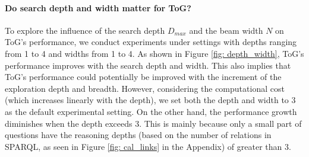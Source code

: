 \documentclass{article} %
\begin{document}
\paragraph{Do search depth and width matter for ToG?}
\label{sec: depth_breadth}
\begin{table}
\centering
\vspace{-0.4cm}
\caption{Performances of ToG using different source KGs on CWQ and WebQSP.}
\label{table: KG}
\end{table}
To explore the influence of the search depth $D_{max}$ and the beam width $N$ on ToG's performance, we conduct experiments under settings with depths ranging from 1 to 4 and widths from 1 to 4. As shown in Figure \ref{fig: depth_width}, ToG's performance improves with the search depth and width. This also implies that ToG's performance could potentially be improved with the increment of the exploration depth and breadth.
However, considering the computational cost (which increases linearly with the depth), we set both the depth and width to 3 as the default experimental setting. On the other hand, the performance growth diminishes when the depth exceeds 3. This is mainly because only a small part of questions have the reasoning depths (based on the number of relations in SPARQL,
as seen in Figure \ref{fig: cal_links} in the Appendix) 
 of greater than 3. 
\end{document}
